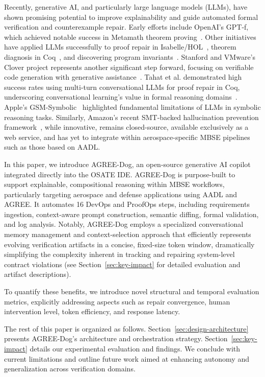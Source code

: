 Recently, generative AI, and particularly large language models (LLMs), have shown promising potential to improve explainability and guide automated formal verification and counterexample repair. Early efforts include OpenAI’s GPT-f, which achieved notable success in Metamath theorem proving~\cite{polu2020generative, megill2019metamath}. Other initiatives have applied LLMs successfully to proof repair in Isabelle/HOL~\cite{first2023baldur}, theorem diagnosis in Coq~\cite{zhang2023getting}, and discovering program invariants~\cite{pei2023can, wu2023lemur}. Stanford and VMware’s Clover project represents another significant step forward, focusing on verifiable code generation with generative assistance~\cite{sun2024clover}. Tahat et al. demonstrated high success rates using multi-turn conversational LLMs for proof repair in Coq, underscoring conversational learning’s value in formal reasoning domains~\cite{CoqDog, CoqDogHCSS24}.
%
Apple's GSM-Symbolic~\cite{mirzadeh2025gsmsymbolic} highlighted fundamental limitations of LLMs in symbolic reasoning tasks. Similarly, Amazon’s recent SMT-backed hallucination prevention framework~\cite{amazon2024mathematical}, while innovative, remains closed-source, available exclusively as a web service, and has yet to integrate within aerospace-specific MBSE pipelines such as those based on AADL.

In this paper, we introduce AGREE-Dog, an open-source generative AI copilot integrated directly into the OSATE IDE. AGREE-Dog is purpose-built to support explainable, compositional reasoning within MBSE workflows, particularly targeting aerospace and defense applications using AADL and AGREE. It automates 16 DevOps and ProofOps steps, including requirements ingestion, context-aware prompt construction, semantic diffing, formal validation, and log analysis. Notably, AGREE-Dog employs a specialized conversational memory management and context-selection approach that efficiently represents evolving verification artifacts in a concise, fixed-size token window, dramatically simplifying the complexity inherent in tracking and repairing system-level contract violations (see Section~\ref{sec:key-impact} %
for detailed evaluation and artifact descriptions).

To quantify these benefits, we introduce novel structural and temporal evaluation metrics, explicitly addressing aspects such as repair convergence, human intervention level, token efficiency, and response latency.

The rest of this paper is organized as follows. 
Section~\ref{sec:design-architecture} presents AGREE-Dog’s architecture and orchestration strategy. Section~\ref{sec:key-impact} details our experimental evaluation and findings. We conclude with current limitations and outline future work aimed at enhancing autonomy and generalization across verification domains.


